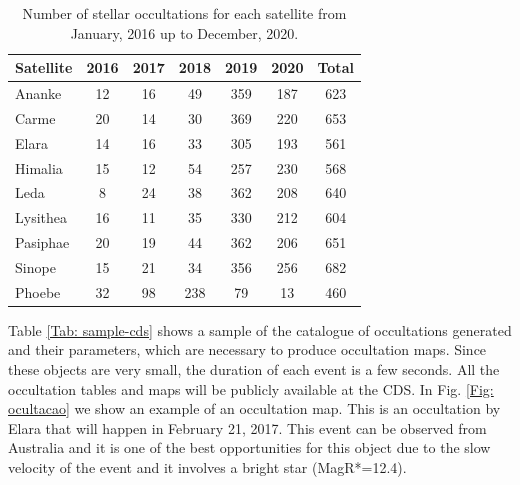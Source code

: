 \documentclass[useAMS,usenatbib]{mn2e}
\begin{document}
\begin{table}
\caption{\label{Tab: satellite-occultation} Number of stellar occultations for each satellite from January, 2016 up to December, 2020.}
\begin{centering}
\begin{tabular}{lcccccc}
\hline  \hline
Satellite  & 2016 & 2017 & 2018 & 2019 & 2020 & Total \tabularnewline
\hline
Ananke & 12 & 16 & 49 & 359 & 187 & 623 \tabularnewline
Carme & 20 & 14 & 30 & 369 & 220 & 653 \tabularnewline
Elara & 14 & 16 & 33 & 305 & 193 & 561 \tabularnewline
Himalia & 15 & 12 & 54 & 257 & 230 & 568 \tabularnewline
Leda & 8 & 24 & 38 & 362 & 208 & 640 \tabularnewline
Lysithea & 16 & 11 & 35 & 330 & 212 & 604 \tabularnewline
Pasiphae & 20 & 19 & 44 & 362 & 206 & 651 \tabularnewline
Sinope & 15 & 21 & 34 & 356 & 256 & 682 \tabularnewline
\hdashline
Phoebe & 32 & 98 & 238 & 79 & 13 & 460 \tabularnewline
\hline
\end{tabular}
\par \end{centering}
\end{table}

Table \ref{Tab: sample-cds} shows a sample of the catalogue of occultations generated and their parameters, which are necessary to produce occultation maps. Since these objects are very small, the duration of each event is a few seconds. All the occultation tables and maps will be publicly available at the CDS. In Fig. \ref{Fig: ocultacao} we show an example of an occultation map. This is an occultation by Elara that will happen in February 21, 2017. This event can be observed from Australia and it is one of the best opportunities for this object due to the slow velocity of the event and it involves a bright star (MagR*=12.4).
\end{document}
